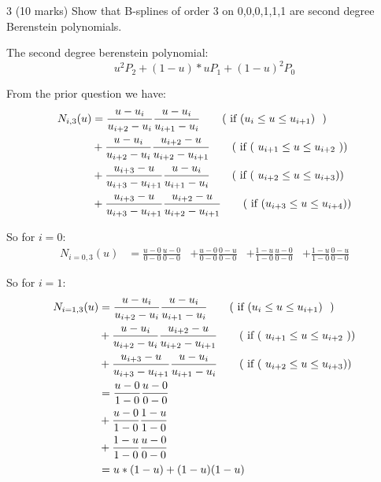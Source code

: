3 (10 marks) Show that B-splines of order 3 on {0,0,0,1,1,1} are second degree Berenstein polynomials.

The second degree berenstein polynomial:
$$ u^2 P_2 + (1-u)*u P_1 + (1-u)^2 P_0 $$

From the prior question we have:
\begin{align*}
N_{i,3}(u)  
            &= \frac {u - u_{i}} {u_{i+2} - u_{i}} \frac{u - u_{i}} {u_{i+1} - u_{i}}  \tag{\text{ if ($ u_i \leq u \leq u_{i+1} $) } } \\
            &+ \frac {u - u_{i}} {u_{i+2} - u_{i}}  \frac{u_{i+2} - u } { u_{i+2} - u_{i+1}}  \tag{\text{ if ( $u_{i+1} \leq u \leq u_{i+2}$ )}} \\
            &+ \frac {u_{i+3} - u} { u_{i+3} - u_{i+1}} \frac {u - u_{i}} {u_{i+1} - u_{i}} \tag{\text{ if ( $u_{i+2} \leq u \leq u_{i+3} $)}} \\
            &+ \frac {u_{i+3} - u} { u_{i+3} - u_{i+1}} \frac{u_{i+2} - u } { u_{i+2} - u_{i+1} } \tag{\text{ if ($ u_{i+3} \leq u \leq u_{i+4} $)}}
\end{align*}

So for $i=0$:
\begin{align*}
N_{i=0,3}(u)
            &= \frac {u - 0} {0 - 0} \frac{u - 0} {0 - 0} %
            &+ \frac {u - 0} {0 - 0} \frac{0 - u} {0 - 0} %
            &+ \frac {1 - u} { 1 - 0}\frac{u - 0} {0 - 0} %
            &+ \frac {1 - u} { 1 - 0}\frac{0 - u} {0 - 0} %
\end{align*}


So for $i=1$:
\begin{align*}
N_{i=1,3}(u)
            &= \frac {u - u_{i}} {u_{i+2} - u_{i}} \frac{u - u_{i}} {u_{i+1} - u_{i}}  \tag{\text{ if ($ u_i \leq u \leq u_{i+1} $) } } \\
            &+ \frac {u - u_{i}} {u_{i+2} - u_{i}}  \frac{u_{i+2} - u } { u_{i+2} - u_{i+1}}  \tag{\text{ if ( $u_{i+1} \leq u \leq u_{i+2}$ )}} \\
            &+ \frac {u_{i+3} - u} { u_{i+3} - u_{i+1}} \frac {u - u_{i}} {u_{i+1} - u_{i}} \tag{\text{ if ( $u_{i+2} \leq u \leq u_{i+3} $)}} \\
            &= \frac {u - 0} {1 - 0} \frac{u - 0}  {0 - 0} \\
            &+ \frac {u - 0} {1 - 0} \frac{1 - u } { 1 - 0} \\
            &+ \frac {1 - u} {1 - 0} \frac{u - 0 } { 0 - 0} \\
            &= u*(1-u) + (1-u)(1-u)
\end{align*}

